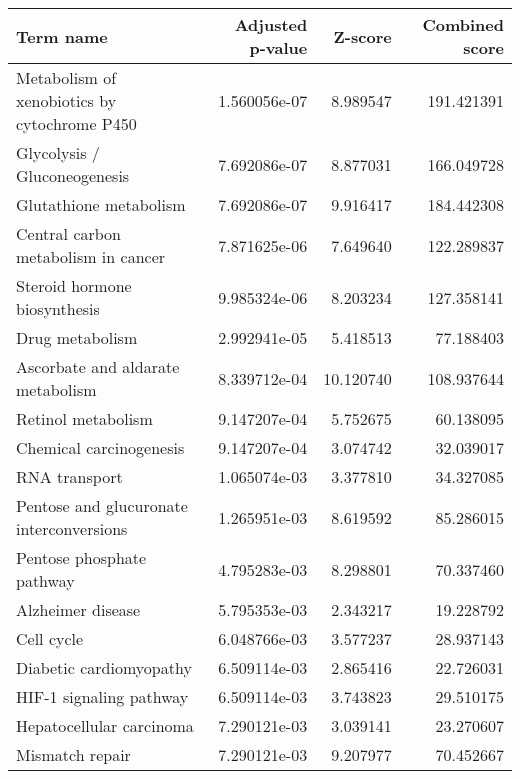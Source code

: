 \begin{tabular}{lrrr}
\toprule
                                   Term name &  Adjusted p-value &   Z-score &  Combined score \\
\midrule
Metabolism of xenobiotics by cytochrome P450 &      1.560056e-07 &  8.989547 &      191.421391 \\
                Glycolysis / Gluconeogenesis &      7.692086e-07 &  8.877031 &      166.049728 \\
                      Glutathione metabolism &      7.692086e-07 &  9.916417 &      184.442308 \\
         Central carbon metabolism in cancer &      7.871625e-06 &  7.649640 &      122.289837 \\
                Steroid hormone biosynthesis &      9.985324e-06 &  8.203234 &      127.358141 \\
                             Drug metabolism &      2.992941e-05 &  5.418513 &       77.188403 \\
           Ascorbate and aldarate metabolism &      8.339712e-04 & 10.120740 &      108.937644 \\
                          Retinol metabolism &      9.147207e-04 &  5.752675 &       60.138095 \\
                     Chemical carcinogenesis &      9.147207e-04 &  3.074742 &       32.039017 \\
                               RNA transport &      1.065074e-03 &  3.377810 &       34.327085 \\
    Pentose and glucuronate interconversions &      1.265951e-03 &  8.619592 &       85.286015 \\
                   Pentose phosphate pathway &      4.795283e-03 &  8.298801 &       70.337460 \\
                           Alzheimer disease &      5.795353e-03 &  2.343217 &       19.228792 \\
                                  Cell cycle &      6.048766e-03 &  3.577237 &       28.937143 \\
                     Diabetic cardiomyopathy &      6.509114e-03 &  2.865416 &       22.726031 \\
                     HIF-1 signaling pathway &      6.509114e-03 &  3.743823 &       29.510175 \\
                    Hepatocellular carcinoma &      7.290121e-03 &  3.039141 &       23.270607 \\
                             Mismatch repair &      7.290121e-03 &  9.207977 &       70.452667 \\

\end{tabular}
